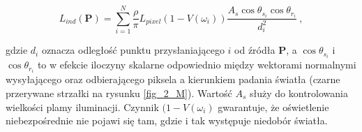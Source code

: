		\begin{equation}
		L_{ind}(\mathbf{P}) = \sum_{i=1}^{N}\frac{\rho}{\pi}L_{pixel}(1 - V(\omega_{i}))\frac{A_{s}\cos\theta_{s_{i}}\cos\theta_{r_{i}}}{d_{i}^2} \ ,
		\end{equation}
		
		gdzie \(d_{i}\) oznacza odległość punktu przysłaniającego \(i\) od źródła \(\mathbf{P}\), a \(\cos\theta_{s_{i}}\) i \(\cos\theta_{r_{i}}\) to w efekcie iloczyny skalarne odpowiednio między wektorami normalnymi wysyłającego oraz odbierającego piksela a kierunkiem padania światła (czarne przerywane strzałki na rysunku \ref{fig_2_M}). Wartość \(A_{s}\) służy do kontrolowania wielkości plamy iluminacji. Czynnik \((1 - V(\omega_{i})\) gwarantuje, że oświetlenie niebezpośrednie nie pojawi się tam, gdzie i tak występuje niedobór światła.

